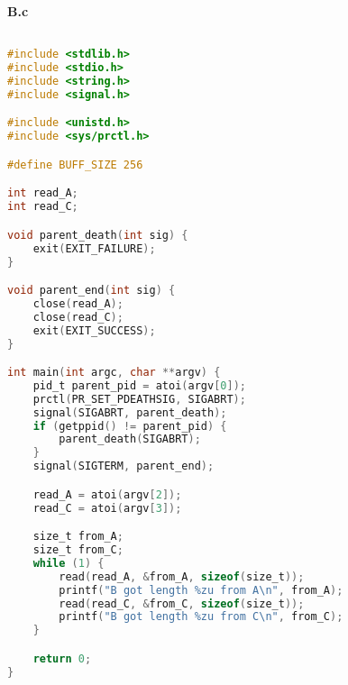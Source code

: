 \textbf{B.c}

\begin{lstlisting}[language=C]

#include <stdlib.h>
#include <stdio.h>
#include <string.h>
#include <signal.h>

#include <unistd.h>
#include <sys/prctl.h>

#define BUFF_SIZE 256

int read_A;
int read_C;

void parent_death(int sig) {
    exit(EXIT_FAILURE);
}

void parent_end(int sig) {
    close(read_A);
    close(read_C);
    exit(EXIT_SUCCESS);
}

int main(int argc, char **argv) {
    pid_t parent_pid = atoi(argv[0]);
    prctl(PR_SET_PDEATHSIG, SIGABRT);
    signal(SIGABRT, parent_death);
    if (getppid() != parent_pid) {
        parent_death(SIGABRT);
    }
    signal(SIGTERM, parent_end);

    read_A = atoi(argv[2]);
    read_C = atoi(argv[3]);

    size_t from_A;
    size_t from_C;
    while (1) {
        read(read_A, &from_A, sizeof(size_t));
        printf("B got length %zu from A\n", from_A);
        read(read_C, &from_C, sizeof(size_t));
        printf("B got length %zu from C\n", from_C);
    }

    return 0;
}

\end{lstlisting}

\pagebreak